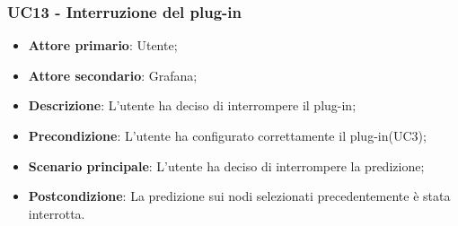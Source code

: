 \subsubsection{UC13 - Interruzione del plug-in}
\label{sssec:uc13}
\begin{itemize}
  \item \textbf{Attore primario}: Utente;
  \item \textbf{Attore secondario}: Grafana;
  \item \textbf{Descrizione}: L'utente ha deciso di interrompere il plug-in;
  \item \textbf{Precondizione}: L'utente ha configurato correttamente il plug-in(UC3);
  \item \textbf{Scenario principale}: L'utente ha deciso di interrompere la predizione;
  \item \textbf{Postcondizione}: La predizione sui nodi selezionati precedentemente è stata interrotta.
\end{itemize}
